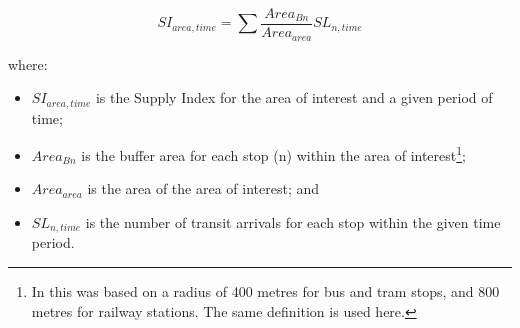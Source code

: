 \documentclass[preprint, 3p,
authoryear]{elsarticle} %
\begin{document}
\[SI_{area, time} = \sum{\frac{Area_{Bn}}{Area_{area}}SL_{n, time}}\]

where:

\begin{itemize}
\item
  \(SI_{area, time}\) is the Supply Index for the area of interest and a
  given period of time;
\item
  \(Area_{Bn}\) is the buffer area for each stop (n) within the area of
  interest\footnote{In \citet{currie2010identifying} this was based on a
    radius of 400 metres for bus and tram stops, and 800 metres for
    railway stations. The same definition is used here.};
\item
  \(Area_{area}\) is the area of the area of interest; and
\item
  \(SL_{n,time}\) is the number of transit arrivals for each stop within
  the given time period.
\end{itemize}
\end{document}
